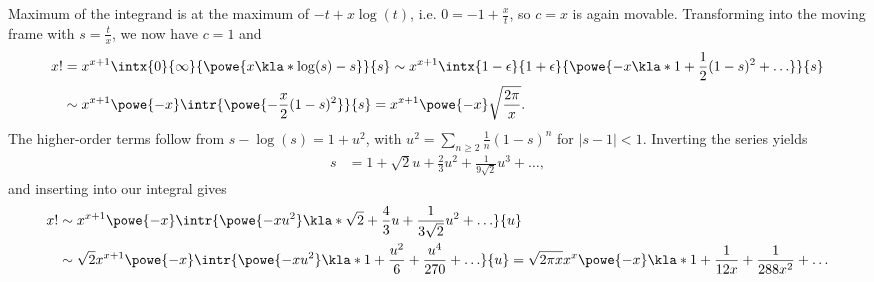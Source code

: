 \documentclass[english, parskip=full]{scrbook}
\newcommand{\example}[3]{\begin{tcolorbox}[colback=colorbackgroundexample,colframe=colorexample, breakable,enhanced,title={\textbf{#1}: #2.}]#3\end{tcolorbox}}
\begin{document}
\example{Stirling Formula}{$x! = \intx{0}{\infty}{t^x \powe{-t}}{t}$ as $x\rightarrow\infty$}{Maximum of the integrand is at the maximum of $-t+x\log(t)$, i.e. $0=-1+\frac{x}{t}$, so $c=x$ is again movable.
Transforming into the moving frame with $s=\frac{t}{x}$, we now have $c=1$ and
\begin{align}
x! &= x^{x+1} \intx{0}{\infty}{\powe{x \kla*{\log(s)-s}}}{s} \sim x^{x+1} \intx{1-\epsilon}{1+\epsilon}{\powe{-x\kla*{1 + \frac{1}{2}(1-s)^2 + \dots}}}{s}\\
&\sim x^{x+1} \powe{-x} \intr{\powe{-\frac{x}{2}(1-s)^2}}{s} = x^{x+1} \powe{-x} \sqrt{\frac{2\pi}{x}}.
\end{align}
The higher-order terms follow from $s-\log(s) = 1+u^2$, with $u^2 = \sum_{n\ge 2} \frac{1}{n}(1-s)^n$ for $|s-1|<1$.
Inverting the series yields
\begin{align}
s &= 1 + \sqrt{2}u + \frac{2}{3}u^2 + \frac{1}{9\sqrt{2}} u^3 + \dots,
\end{align}
and inserting into our integral gives
\begin{align}
x! &\sim x^{x+1} \powe{-x} \intr{\powe{-xu^2} \kla*{\sqrt{2} + \frac{4}{3}u + \frac{1}{3\sqrt{2}} u^2 + \dots} }{u}\\
&\sim \sqrt{2} x^{x+1} \powe{-x} \intr{\powe{-xu^2} \kla*{1 + \frac{u^2}{6} + \frac{u^4}{270} + \dots}}{u} = \sqrt{2\pi x} x^x \powe{-x} \kla*{1 + \frac{1}{12x} + \frac{1}{288x^2} + \dots}
\end{align}
}
\end{document}
